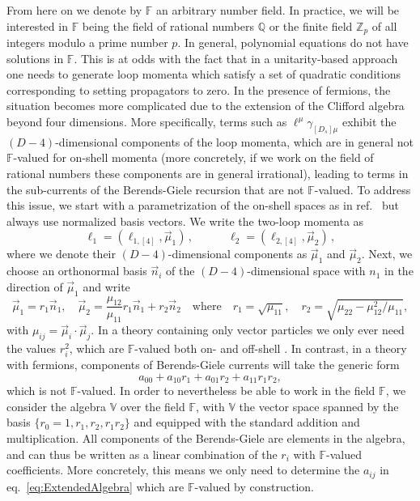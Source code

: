 From here on we denote by $\mathbb{F}$ an arbitrary 
number field. In practice, we will be interested in
$\mathbb{F}$ being the field of rational numbers $\mathbb{Q}$
or the finite field $\mathbb{Z}_p$
of all integers modulo a prime number $p$.
In general, polynomial equations do not have solutions in 
$\mathbb{F}$. This is at odds with the fact that
in a unitarity-based approach one needs 
to generate loop momenta which satisfy a set of quadratic
conditions corresponding to setting propagators to zero.
%
In the presence of fermions, the situation becomes more 
complicated due to the extension of the Clifford algebra beyond 
four dimensions. More specifically, terms such as $\ell^\mu
\gamma_{[D_s]\mu}$ exhibit the $(D-4)$-dimensional
components of the loop momenta,
which are in general not 
$\mathbb{F}$-valued for on-shell momenta
(more concretely, if we work on the field of rational numbers
these components are in general irrational),
leading to terms in the sub-currents of the
Berends-Giele recursion that are not $\mathbb{F}$-valued. 
%
To address this issue,
we start with a parametrization of the on-shell spaces as in 
ref.~\cite{Abreu:2017hqn} but always use normalized basis
vectors. We write the two-loop momenta as
\begin{equation}
    \ell_1 = (\ell_{1,[4]}, \vec{\mu}_1)\,,\quad \quad \quad
    \ell_2 = (\ell_{2,[4]}, \vec{\mu}_2)\,, 
    \label{eq:loopmomenta}
\end{equation}
where we denote their $(D-4)$-dimensional components as 
$\vec{\mu}_1$ and $\vec{\mu}_2$. Next, we choose an orthonormal
basis $\vec{n}_i$ of the $(D-4)$-dimensional space with
$n_1$ in the direction of $\vec{\mu}_1$ and write
\begin{equation}
\vec{\mu}_1 = r_1 \vec{n}_1, \quad  \vec{\mu}_2 = \frac{\mu_{12}}{\mu_{11}} r_1 \vec{n}_1 + r_2 \vec{n}_2
  \quad \mathrm{where} \quad r_1 = \sqrt{\mu_{11}}, \quad r_2 = 
  \sqrt{\mu_{22} - \mu_{12}^2/\mu_{11}},
\end{equation}
with $\mu_{ij}=\vec{\mu}_i\cdot\vec{\mu}_j$.
In a theory containing only vector particles we only ever need 
the values $r_i^2$, which are $\mathbb{F}$-valued both on- and
off-shell \cite{Abreu:2017hqn}. In contrast, in a theory with
fermions, components of Berends-Giele currents will take the
generic form
\begin{equation}
  \label{eq:ExtendedAlgebra}
  a_{00} + a_{10} r_1 + a_{01} r_2 + a_{11} r_1 r_2, 
\end{equation}
which is not $\mathbb{F}$-valued.
In order to nevertheless be able to
work in the field $\mathbb{F}$,
we consider 
the algebra $\mathbb{V}$ over the field $\mathbb{F}$, with 
$\mathbb{V}$ the vector space spanned by the basis 
$\{r_0=1,r_1,r_2,r_1r_2\}$ and equipped with the standard
addition and multiplication.
All components of the Berends-Giele are elements 
in the algebra, and can thus be written as a linear combination
of the $r_i$ with $\mathbb{F}$-valued coefficients. More
concretely, this means we only need to determine the $a_{ij}$ 
in eq.~\eqref{eq:ExtendedAlgebra} which are $\mathbb{F}$-valued
by construction.

